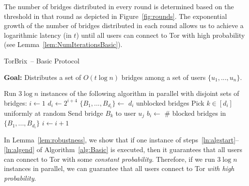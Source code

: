 \documentclass{llncs}
\newcommand{\algFont}{\fontsize{10}{13}\selectfont}
\newcommand{\sfsize}{\fontsize{0.73\baselineskip}{0.73\baselineskip}\selectfont}
\newcommand{\sans}[1]{\textsf{\sfsize \mbox{#1}}}
\newcommand{\brix}{\sans{TorBrix}\xspace}
\begin{document}

The number of bridges distributed in every round is determined based on the threshold in that round as depicted in Figure~\ref{fig:rounds}. The exponential growth of the number of bridges distributed in each round allows us to achieve a logarithmic latency (in $t$) until all users can connect to Tor with high probability (see Lemma~\ref{lem:NumIterationsBasic}). 
\begin{algorithm}[t]
	\caption{\brix~-- Basic Protocol}
	\label{alg:Basic}
	\vspace{0.4em}
	\textbf{Goal:} Distributes a set of $O(t\log{n})$ bridges among a set of users $\{u_1,...,u_n\}$.
	
	\algFont \vspace{2pt}
	\begin{algorithmic}[1]
		\Statex \hspace{-\algorithmicindent} Run $3\log{n}$ instances of the following algorithm in parallel with disjoint sets of bridges:
		\State ${i \gets 1}$  \label{ln:algstart}
		\While{\True}
			\State $d_i \gets 2^{i+4}$	\label{ln:forparallel} \label{ln:ifreasonable}
				\State $\{B_1,...,B_{d_i}\} \gets$ $d_i$ unblocked bridges \label{ln:RecruitBridges}						
					
					\State Pick $k \in [d_i]$ uniformly at random 
					\State Send bridge $B_{k}$ to user $u_j$				
				\EndFor			\label{ln:IterationEnd}
			 \label{ln:ConditionSimple} %
				\State $b_i \gets$ \# blocked bridges in $\{B_1, ..., B_{d_i}\}$
			\EndWhile
			\State $i \gets i+1$ \label{ln:IncrementSimple}
		\EndWhile	\label{ln:algend}
	\end{algorithmic}	
\end{algorithm}
In Lemma~\ref{lem:robustness}, we show that if one instance of steps~\ref{ln:algstart}--\ref{ln:algend} of Algorithm~\ref{alg:Basic} is executed, then it guarantees that all users can connect to Tor with some \emph{constant probability}. Therefore, if we run $3\log{n}$ instances in parallel, we can guarantee that all users connect to Tor \emph{with high probability}.
\end{document}
